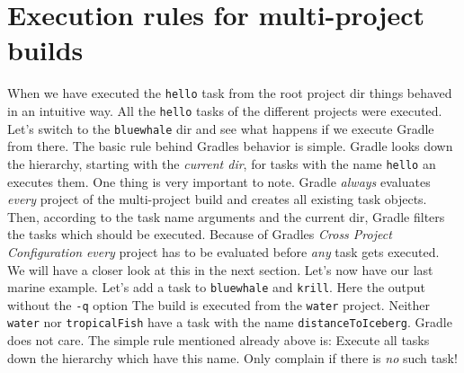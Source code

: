 \section{Execution rules for multi-project builds} %
\label{sec:execution_rules_for_multi_project_builds}
When we have executed the \texttt{hello} task from the root project dir things behaved in an intuitive way. All the \texttt{hello} tasks of the different projects were executed. Let's switch to the \texttt{bluewhale} dir and see what happens if we execute Gradle from there. 
The basic rule behind Gradles behavior is simple. Gradle looks down the hierarchy, starting with the \emph{current dir}, for tasks with the name \texttt{hello} an executes them. One thing is very important to note. Gradle \emph{always} evaluates \emph{every} project of the multi-project build and creates all existing task objects. Then, according to the task name arguments and the current dir, Gradle filters the tasks which should be executed. Because of Gradles \emph{Cross Project Configuration} \emph{every} project has to be evaluated before \emph{any} task gets executed. We will have a closer look at this in the next section. Let's now have our last marine example. Let's add a task to \texttt{bluewhale} and \texttt{krill}.
Here the output without the \texttt{-q} option
The build is executed from the \texttt{water} project. Neither \texttt{water} nor \texttt{tropicalFish} have a task with the name \texttt{distanceToIceberg}. Gradle does not care. The simple rule mentioned already above is: Execute all tasks down the hierarchy which have this name. Only complain if there is \emph{no} such task!

